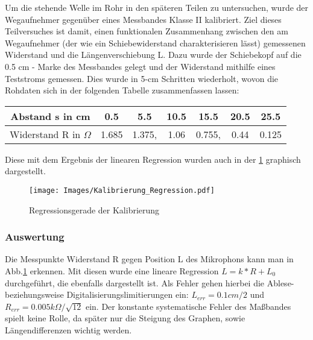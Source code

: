 \documentclass[]{article}
\begin{document}
	Um die stehende Welle im Rohr in den späteren Teilen zu untersuchen, wurde der Wegaufnehmer gegenüber eines Messbandes Klasse II kalibriert. Ziel dieses Teilversuches ist damit, einen funktionalen Zusammenhang zwischen den am Wegaufnehmer (der wie ein Schiebewiderstand charakterisieren lässt) gemessenen Widerstand und die Längenverschiebung L. Dazu wurde der {\color{red} {Schiebekopf}} auf die 0.5 cm - Marke des Messbandes gelegt und der Widerstand mithilfe eines Teststroms gemessen. Dies wurde in 5-cm Schritten wiederholt, wovon die Rohdaten sich in der folgenden Tabelle zusammenfassen lassen:
	
	\begin{center}

	\begin{tabular}{|c|c|c|c|c|c|c|}
		\hline 
		Abstand s in cm & 0.5 & 5.5 & 10.5 & 15.5 & 20.5 & 25.5 \\ 
		\hline 
		Widerstand R in $\Omega$ & 1.685 & 1.375, & 1.06 & 0.755, & 0.44 & 0.125 \\ 
		\hline 
	\end{tabular} 
	\end{center}

	Diese mit dem Ergebnis der linearen Regression wurden auch in der \ref{Kalib_Reg} graphisch dargestellt.
	
	\begin{figure}
		\begin{center}
			\texttt{[image: Images/Kalibrierung\_Regression.pdf]}
			\caption{Regressionsgerade der Kalibrierung}             
			\label{Kalib_Reg}               
		\end{center}            
	\end{figure} 
	
	\subsubsection{Auswertung}
	
	Die Messpunkte Widerstand R gegen Position L des Mikrophons kann man in Abb.\ref{Kalib_Reg} erkennen. Mit diesen wurde eine lineare Regression $L=k*R+L_0$ durchgeführt, die ebenfalls dargestellt ist. Als Fehler gehen hierbei die Ablese- beziehungsweise Digitalisierungslimitierungen ein: $L_{err}=0.1cm/2$ und $R_{err}=0.005k\Omega/\sqrt{12}$ ein. Der konstante systematische Fehler des Maßbandes spielt keine Rolle, da später nur die Steigung des Graphen, sowie Längendifferenzen wichtig werden.
	           
\end{document}
